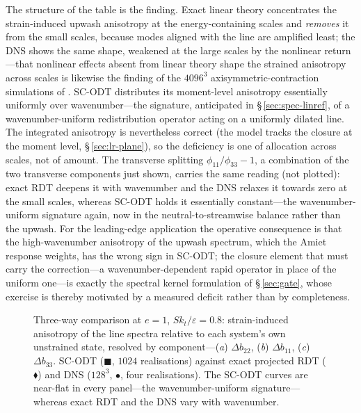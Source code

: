 \documentclass[11pt,a4paper]{article}
\begin{document}
The structure of the table is the finding. Exact linear theory concentrates
the strain-induced upwash anisotropy at the energy-containing scales and
\emph{removes} it from the small scales, because modes aligned with the
line are amplified least; the DNS shows the same shape, weakened at the
large scales by the nonlinear return---that nonlinear effects absent from
linear theory shape the strained anisotropy across scales is likewise the
finding of the $4096^3$ axisymmetric-contraction simulations of
\citet{ClayYeung2016}. SC-ODT distributes
its moment-level anisotropy essentially uniformly over wavenumber---the
signature, anticipated in \S\,\ref{sec:spec-linref}, of a
wavenumber-uniform redistribution operator acting on a uniformly dilated
line. The integrated anisotropy is nevertheless correct (the model tracks
the closure at the moment level, \S\,\ref{sec:lr-plane}), so the deficiency
is one of allocation across scales, not of amount. The transverse
splitting $\phi_{11}/\phi_{33}-1$, a combination of the two transverse
components just shown, carries the same reading (not plotted): exact RDT
deepens it with wavenumber and the DNS relaxes it towards zero at the
small scales, whereas SC-ODT holds it essentially constant---the
wavenumber-uniform signature again, now in the neutral-to-streamwise
balance rather than the upwash. For the leading-edge
application the operative consequence is that the high-wavenumber
anisotropy of the upwash spectrum, which the Amiet response weights, has
the wrong sign in SC-ODT; the closure element that must carry
the correction---a wavenumber-dependent rapid operator in place of the
uniform one---is exactly the spectral kernel formulation of
\S\,\ref{sec:gate}, whose exercise is thereby motivated by a measured
deficit rather than by completeness.

\begin{figure}
  \centering
  \caption{Three-way comparison at $e=1$, $Sk_t/\varepsilon=0.8$:
  strain-induced anisotropy of the line spectra relative to each system's
  own unstrained state, resolved by component---(\textit{a})
  $\Delta b_{22}$, (\textit{b}) $\Delta b_{11}$, (\textit{c})
  $\Delta b_{33}$. SC-ODT ($\blacksquare$, $1024$ realisations)
  against exact projected RDT ($\blacklozenge$) and DNS ($128^3$,
  $\bullet$, four realisations). The SC-ODT curves are near-flat in every
  panel---the wavenumber-uniform signature---whereas exact RDT and the DNS
  vary with wavenumber.}
  \label{fig:threeway}
\end{figure}
\end{document}
